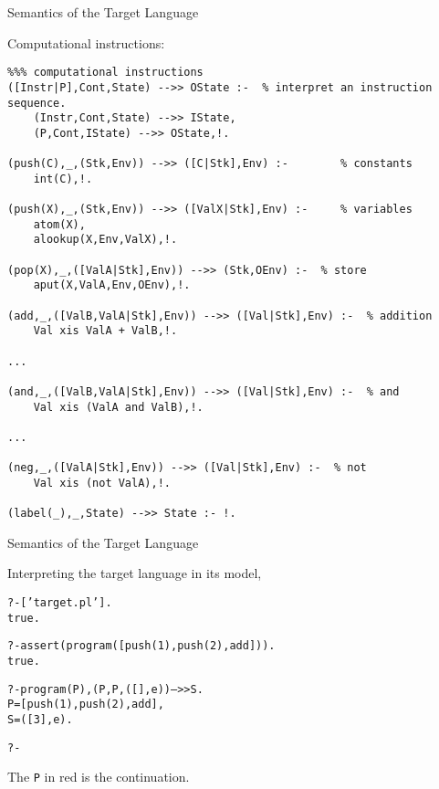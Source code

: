 \documentclass{beamer}
\begin{document}
\begin{frame}[fragile]{Semantics of the Target Language}

\scriptsize
Computational instructions:
\tiny
\begin{verbatim}
%%% computational instructions
([Instr|P],Cont,State) -->> OState :-  % interpret an instruction sequence.
    (Instr,Cont,State) -->> IState,
    (P,Cont,IState) -->> OState,!.

(push(C),_,(Stk,Env)) -->> ([C|Stk],Env) :-        % constants
    int(C),!.

(push(X),_,(Stk,Env)) -->> ([ValX|Stk],Env) :-     % variables
    atom(X),
    alookup(X,Env,ValX),!.

(pop(X),_,([ValA|Stk],Env)) -->> (Stk,OEnv) :-  % store
    aput(X,ValA,Env,OEnv),!.

(add,_,([ValB,ValA|Stk],Env)) -->> ([Val|Stk],Env) :-  % addition
    Val xis ValA + ValB,!.

...

(and,_,([ValB,ValA|Stk],Env)) -->> ([Val|Stk],Env) :-  % and
    Val xis (ValA and ValB),!.

...

(neg,_,([ValA|Stk],Env)) -->> ([Val|Stk],Env) :-  % not
    Val xis (not ValA),!.

(label(_),_,State) -->> State :- !.
\end{verbatim}
\end{frame}

\begin{frame}[fragile]{Semantics of the Target Language}

\scriptsize
Interpreting the target language in its model,
\begin{alltt}
?- ['target.pl'].
%  xis.pl compiled 0.00 sec, 6,824 bytes
% target.pl compiled 0.00 sec, 14,600 bytes
true.

?- assert(program([push(1),push(2),add])).
true.

?- program(P), (P,{\color{red}P},([],e)) -->> S.
P = [push(1), push(2), add],
S = ([3], e).

?- 
\end{alltt}
The {\tt P} in red is the continuation.
\end{frame}
\end{document}

